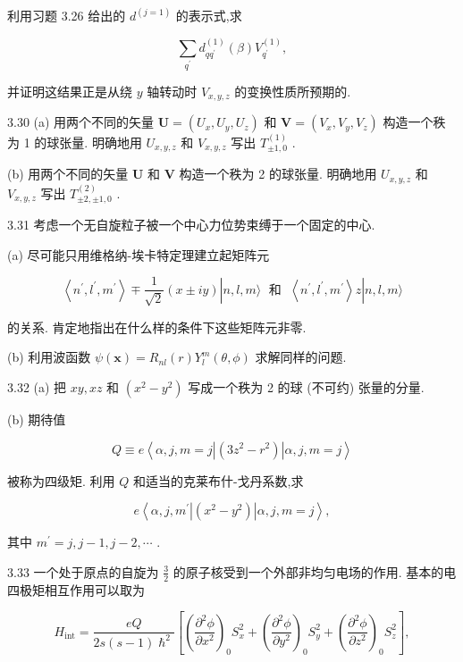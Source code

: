 利用习题 3.26 给出的 ${d}^{\left( j = 1\right) }$ 的表示式,求

$$
\mathop{\sum }\limits_{{q}^{\prime }}{d}_{q{q}^{\prime }}^{\left( 1\right) }\left( \beta \right) {V}_{{q}^{\prime }}^{\left( 1\right) },
$$

并证明这结果正是从绕 $y$ 轴转动时 ${V}_{x, y, z}$ 的变换性质所预期的.

3.30 (a) 用两个不同的矢量 $\mathbf{U} = \left( {{U}_{x},{U}_{y},{U}_{z}}\right)$ 和 $\mathbf{V} = \left( {{V}_{x},{V}_{y},{V}_{z}}\right)$ 构造一个秩为 1 的球张量. 明确地用 ${U}_{x, y, z}$ 和 ${V}_{x, y, z}$ 写出 ${T}_{\pm 1,0}^{\left( 1\right) }$ .

(b) 用两个不同的矢量 $\mathbf{U}$ 和 $\mathbf{V}$ 构造一个秩为 2 的球张量. 明确地用 ${U}_{x, y, z}$ 和 ${V}_{x, y, z}$ 写出 ${T}_{\pm 2, \pm 1,0}^{\left( 2\right) }$ .

3.31 考虑一个无自旋粒子被一个中心力位势束缚于一个固定的中心.

(a) 尽可能只用维格纳-埃卡特定理建立起矩阵元

$$
\left\langle {{n}^{\prime },{l}^{\prime },{m}^{\prime }}\right\rangle \mp \frac{1}{\sqrt{2}}\left( {x \pm {iy}}\right) \left| {n, l, m\rangle \;\text{ 和 }\;\left\langle {{n}^{\prime },{l}^{\prime },{m}^{\prime }}\right\rangle z}\right| n, l, m\rangle
$$

的关系. 肯定地指出在什么样的条件下这些矩阵元非零.

(b) 利用波函数 $\psi \left( \mathbf{x}\right) = {R}_{nl}\left( r\right) {Y}_{l}^{m}\left( {\theta ,\phi }\right)$ 求解同样的问题.

3.32 (a) 把 ${xy},{xz}$ 和 $\left( {{x}^{2} - {y}^{2}}\right)$ 写成一个秩为 2 的球 (不可约) 张量的分量.

(b) 期待值

$$
Q \equiv e\left\langle {\alpha, j, m = j\left| \left( {3{z}^{2} - {r}^{2}}\right) \right| \alpha, j, m = j}\right\rangle
$$

被称为四级矩. 利用 $Q$ 和适当的克莱布什-戈丹系数,求

$$
e\left\langle {\alpha, j,{m}^{\prime }\left| \left( {{x}^{2} - {y}^{2}}\right) \right| \alpha, j, m = j}\right\rangle ,
$$

其中 ${m}^{\prime } = j, j - 1, j - 2,\cdots$ .

3.33 一个处于原点的自旋为 $\frac{3}{2}$ 的原子核受到一个外部非均匀电场的作用. 基本的电四极矩相互作用可以取为

$$
{H}_{\mathrm{{int}}} = \frac{eQ}{{2s}\left( {s - 1}\right) {\hslash }^{2}}\left\lbrack {{\left( \frac{{\partial }^{2}\phi }{\partial {x}^{2}}\right) }_{0}{S}_{x}^{2} + {\left( \frac{{\partial }^{2}\phi }{\partial {y}^{2}}\right) }_{0}{S}_{y}^{2} + {\left( \frac{{\partial }^{2}\phi }{\partial {z}^{2}}\right) }_{0}{S}_{z}^{2}}\right\rbrack ,
$$

